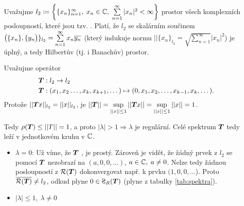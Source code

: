 \Priklad 
Uvažujme $l_2\coloneqq \left \{ \{x_n\}_{n=1}^\infty,\; x_n\in\mathbb{C},\;\sum\limits_{n=1}^\infty|x_n|^2<\infty \right \}$ prostor všech komplexních posloupností, které jsou tzv. . Platí, že $l_2$ se skalárním součinem $\big( \{x_n\}, \{y_n \big)\}_{l_2}=\sum\limits_{n=1}^\infty x_n\overline{y_n}$ (který indukuje normu $||\{x_n\}_{l_2}=\sqrt{\sum_{n=1}^\infty}|x_n|^2$) je úplný, a tedy Hilbertův (tj. i Banachův) prostor.

Uvažujme operátor 
\begin{align*}
    \boldsymbol{T}&:l_2\rightarrow l_2\\
    \boldsymbol{T}&:(x_1,x_2\dots,x_k,x_{k+1},\dots)\mapsto (0,x_1,x_2,\dots,x_{k-1},x_k,\dots).
\end{align*}
Protože $||\boldsymbol{T} x ||_{l_2}=||x||_{l_2}$, je $||\boldsymbol{T}||=\sup\limits_{||x||\leq1}||\boldsymbol{T}x||=\sup\limits_{||x||\leq1}||x||=1$.

Tedy $\rho(\boldsymbol{T})\leq ||T||=1$, a proto $|\lambda|>1\Rightarrow \lambda$ je regulární. Celé spektrum $\boldsymbol{T}$ tedy leží v jednotkovém kruhu v $\mathbb{C}$.

\begin{itemize}
    \item $\lambda=0$: Už víme, že $\boldsymbol{T}$ , je prostý. Zároveň je vidět, že žádný prvek z $l_2$ se pomocí $\boldsymbol{T}$ nezobrazí na $(a,0,0,\dots)$, $a\in\mathbb{C},\; a\neq 0$. Nelze tedy žádnou posloupností z $\mathcal{R}(\boldsymbol{T})$ dokonvergovat např. k prvku $(1,0,0,\dots$). Proto $\overline{\mathcal{R}(\boldsymbol{T})}\neq l_2$, odkud plyne $0\in \Sp_R(\map T)$ (plyne z tabulky \ref{tab:spektra}). 
    \item $|\lambda|\leq 1,\; \lambda\neq 0$
\end{itemize}

